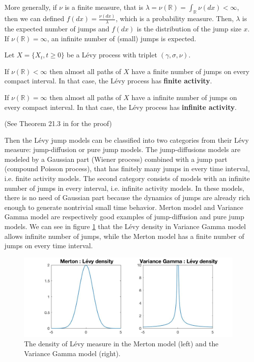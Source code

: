More generally, if $\nu$ is a finite measure, that is $\lambda = \nu(\mathbb{R}) =\int_\mathbb{R}\nu(dx) <\infty$, 
then we can defined $f(dx) = \frac{\nu(dx)}{\lambda}$, which is a probability measure. Then, $\lambda$ is the expected number of jumps and $f(dx)$ is the distribution of the jump size $x$. If $\nu(\mathbb{R}) = \infty$, an infinite number of (small) jumps is expected.

\begin{prop}
Let $X =\{X_t,t\geq 0\}$ be a L\'evy process with triplet $(\gamma,\sigma,\nu)$.
\begin{my_list}
\item If $\nu(\mathbb{R})<\infty$ then almost all paths of $X$ have a finite number of jumps on every compact interval. In that case, the L\'evy process has \textbf{finite activity}.
\item If $\nu(\mathbb{R})=\infty$ then almost all paths of $X$ have a infinite number of jumps on every compact interval. In that case, the L\'evy process has \textbf{infinite activity}.
\end{my_list}
(See Theorem 21.3 in \citeauthor{Sat99} \citeyearpar{Sat99} for the proof)
\end{prop}

Then the L\'evy jump models can be classified into two categories from their L\'evy measure: jump-diffusion or pure jump models. The jump-diffusions models are modeled by a Gaussian part (Wiener process) combined with a jump part (compound Poisson process), that has finitely many jumps in every time interval, i.e. finite activity models. The second category consists of models with an infinite number of jumps in every interval, i.e. infinite activity models. In these models, there is no need of Gaussian part because the dynamics of jumps are already rich enough to generate nontrivial small time behavior. Merton model and Variance Gamma model are respectively good examples of jump-diffusion and pure jump models. We can see in figure \ref{fig:Levy:densities} that the L\'evy density in Variance Gamma model allows infinite number of jumps, while the Merton model has a finite number of jumps on every time interval.

\begin{figure}[!htb]
	\includegraphics[width=\textwidth]{gfx/Levy_densities}
	\caption{The density of L\'evy measure in the Merton model (left) and the Variance Gamma model (right).}
	\label{fig:Levy:densities}
\end{figure}

